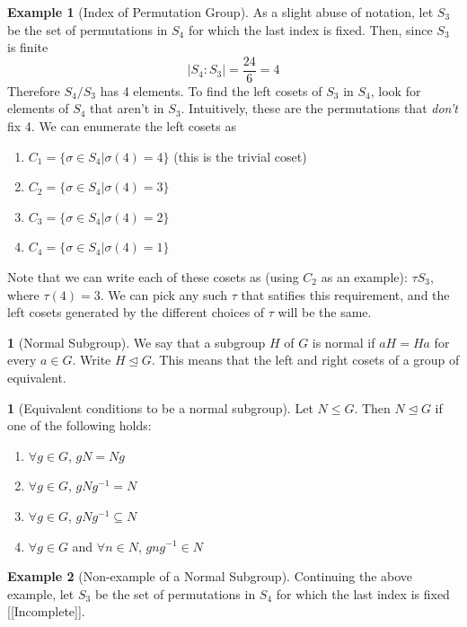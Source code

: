 \documentclass[12pt]{article}
\theoremstyle{definition}
\newtheorem{definition}{\color{NavyBlue}{\textbf{Definition}}}
\newtheorem{theorem}{\color{ForestGreen}{\textbf{Theorem}}}
\newtheorem{example}{\color{WildStrawberry}Example}
\theoremstyle{definition}
\begin{document}
\begin{example}[Index of Permutation Group]
As a slight abuse of notation, let $S_3$ be the set of permutations in $S_4$ for which the last index is fixed. Then, since $S_3$ is finite
\begin{equation}
 	|S_4 : S_3| = \frac{24}{6} = 4
\end{equation} 
Therefore $S_4 / S_3$ has 4 elements. To find the left cosets of $S_3$ in $S_4$, look for elements of $S_4$ that aren't in $S_3$. Intuitively, these are the permutations that \textit{don't} fix 4. We can enumerate the left cosets as
\begin{enumerate}
	\item $C_1 = \{\sigma \in S_4 | \sigma(4) = 4 \}$ (this is the trivial coset)
	\item $C_2 = \{\sigma \in S_4 | \sigma(4) = 3 \}$
	\item $C_3 = \{\sigma \in S_4 | \sigma(4) = 2 \}$
	\item $C_4 = \{\sigma \in S_4 | \sigma(4) = 1 \}$
\end{enumerate}
Note that we can write each of these cosets as (using $C_2$ as an example): $\tau S_3$, where $\tau(4) = 3$. We can pick any such $\tau$ that satifies this requirement, and the left cosets generated by the different choices of $\tau$ will be the same.
\end{example}

\begin{definition}[Normal Subgroup]
We say that a subgroup $H$ of $G$ is normal if $aH = Ha$ for every $a \in G$. Write $H \trianglelefteq G$. This means that the left and right cosets of a group of equivalent.
\end{definition}

\begin{theorem}[Equivalent conditions to be a normal subgroup]
Let $N \leq G$. Then $N \trianglelefteq G$ if one of the following holds:
\begin{enumerate}
	\item $\forall g\in G$, $gN = Ng$
	\item $\forall g\in G$, $gNg^{-1} = N$
	\item $\forall g\in G$, $gNg^{-1} \subseteq N$
	\item $\forall g\in G$ and $\forall n\in N$, $gng^{-1} \in N$
\end{enumerate}
\end{theorem}

\begin{example}[Non-example of a Normal Subgroup]
Continuing the above example, let $S_3$ be the set of permutations in $S_4$ for which the last index is fixed [[Incomplete]].
\end{example}
\end{document}

